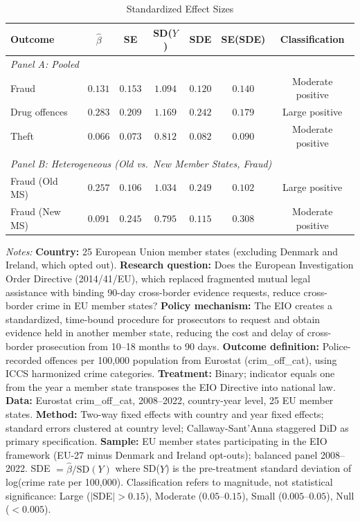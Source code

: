 \begin{table}[t]
\centering
\caption{Standardized Effect Sizes}
\label{tab:sde}
\begin{tabular}{lcccccc}
\hline\hline
Outcome & $\hat{\beta}$ & SE & SD($Y$) & SDE & SE(SDE) & Classification \\
\hline
\multicolumn{7}{l}{\textit{Panel A: Pooled}} \\[0.3ex]
Fraud & $0.131$ & $0.153$ & $1.094$ & $0.120$ & $0.140$ & Moderate positive \\
Drug offences & $0.283$ & $0.209$ & $1.169$ & $0.242$ & $0.179$ & Large positive \\
Theft & $0.066$ & $0.073$ & $0.812$ & $0.082$ & $0.090$ & Moderate positive \\
\\[0.3ex]
\multicolumn{7}{l}{\textit{Panel B: Heterogeneous (Old vs.~New Member States, Fraud)}} \\[0.3ex]
Fraud (Old MS) & $0.257$ & $0.106$ & $1.034$ & $0.249$ & $0.102$ & Large positive \\
Fraud (New MS) & $0.091$ & $0.245$ & $0.795$ & $0.115$ & $0.308$ & Moderate positive \\
\hline\hline
\end{tabular}
\begin{tablenotes}
\item \textit{Notes:} \textbf{Country:} 25 European Union member states (excluding Denmark and Ireland, which opted out). \textbf{Research question:} Does the European Investigation Order Directive (2014/41/EU), which replaced fragmented mutual legal assistance with binding 90-day cross-border evidence requests, reduce cross-border crime in EU member states? \textbf{Policy mechanism:} The EIO creates a standardized, time-bound procedure for prosecutors to request and obtain evidence held in another member state, reducing the cost and delay of cross-border prosecution from 10--18 months to 90 days. \textbf{Outcome definition:} Police-recorded offences per 100,000 population from Eurostat (crim\_off\_cat), using ICCS harmonized crime categories. \textbf{Treatment:} Binary; indicator equals one from the year a member state transposes the EIO Directive into national law. \textbf{Data:} Eurostat crim\_off\_cat, 2008--2022, country-year level, 25 EU member states. \textbf{Method:} Two-way fixed effects with country and year fixed effects; standard errors clustered at country level; Callaway-Sant'Anna staggered DiD as primary specification. \textbf{Sample:} EU member states participating in the EIO framework (EU-27 minus Denmark and Ireland opt-outs); balanced panel 2008--2022. SDE $= \hat{\beta} / \text{SD}(Y)$ where SD($Y$) is the pre-treatment standard deviation of log(crime rate per 100,000). Classification refers to magnitude, not statistical significance: Large ($|$SDE$| > 0.15$), Moderate ($0.05$--$0.15$), Small ($0.005$--$0.05$), Null ($< 0.005$).
\end{tablenotes}
\end{table}
